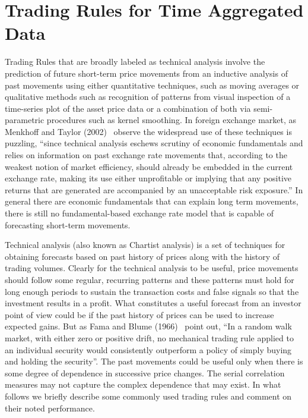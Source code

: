 \section{Trading Rules for Time Aggregated Data}


Trading Rules that are broadly labeled as technical analysis involve the prediction of future short-term price movements from an inductive analysis of past movements using either quantitative techniques, such as moving averages or qualitative methods such as recognition of patterns from visual inspection of a time-series plot of the asset price data or a combination of both via semi-parametric procedures such as kernel smoothing. In foreign exchange market, as Menkhoff and Taylor (2002)~\cite{MalTay} observe the widespread use of these techniques is puzzling, ``since technical analysis eschews scrutiny of economic fundamentals and relies on information on past exchange rate movements that, according to the weakest notion of market efficiency, should already be embedded in the current exchange rate, making its use either unprofitable or implying that any positive returns that are generated are accompanied by an unacceptable risk exposure.'' In general there are economic fundamentals that can explain long term movements, there is still no fundamental-based exchange rate model that is capable of forecasting short-term movements.


Technical analysis (also known as Chartist analysis) is a set of techniques for obtaining forecasts based on past history of prices along with the history of trading volumes. Clearly for the technical analysis to be useful, price movements should follow some regular, recurring patterns and these patterns must hold for long enough periods to sustain the transaction costs and false signals so that the investment results in a profit. What constitutes a useful forecast from an investor point of view could be if the past history of prices can be used to increase expected gains. But as Fama and Blume (1966)~\cite{famablume} point out, ``In a random walk market, with either zero or positive drift, no mechanical trading rule applied to an individual security would consistently outperform a policy of simply buying and holding the security''. The past movements could be useful only when there is some degree of dependence in successive price changes. The serial correlation measures may not capture the complex dependence that may exist. In what follows we briefly describe some commonly used trading rules and comment on their noted performance.


